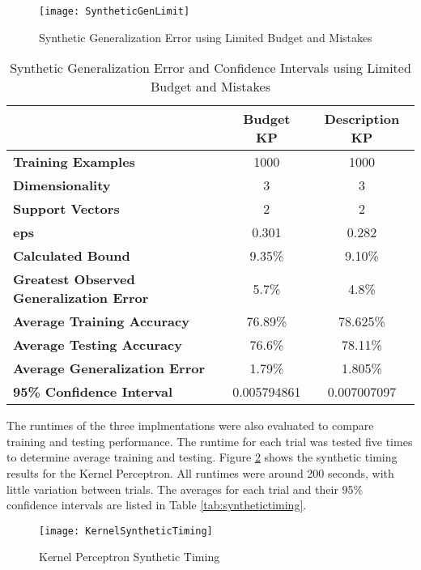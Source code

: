 \begin{figure}[p]
 \caption{Synthetic Generalization Error using Limited Budget and Mistakes}
 \label{SyntheticGenErr2Fig}
 \begin{center}
  \texttt{[image: SyntheticGenLimit]} 
 \end{center}
\end{figure}

\begin{table}[p]
 \begin{center}
  \caption{Synthetic Generalization Error and Confidence Intervals using Limited Budget and Mistakes}
  \label{tab:syntheticlimitedgen}
  \begin{tabular}{l|c|c}
  \textbf{ } & \textbf{Budget KP} & \textbf{Description KP}\\
  \hline
  \textbf{Training Examples} & 1000 & 1000\\
  \textbf{Dimensionality} & 3 & 3\\
  \textbf{Support Vectors} & 2 & 2\\
  \textbf{eps} & 0.301 & 0.282\\
  \hline
  \textbf{Calculated Bound} & 9.35\% & 9.10\%\\
  \textbf{Greatest Observed Generalization Error} & 5.7\% & 4.8\%\\
  \hline
  \textbf{Average Training Accuracy} & 76.89\% & 78.625\%\\
  \textbf{Average Testing Accuracy} & 76.6\% & 78.11\%\\
  \textbf{Average Generalization Error} & 1.79\% & 1.805\%\\
  \textbf{95\% Confidence Interval} & 0.005794861 & 0.007007097\\
  \end{tabular}
 \end{center}
\end{table}

The runtimes of the three implmentations were also evaluated to compare training and testing performance. The runtime for each trial was tested five times to determine average training and testing. Figure \ref{SyntheticKernelTiming} shows the synthetic timing results for the Kernel Perceptron. All runtimes were around 200 seconds, with little variation between trials. The averages for each trial and their 95\% confidence intervals are listed in Table \ref{tab:synthetictiming}.

\begin{figure}[p]
 \caption{Kernel Perceptron Synthetic Timing}
 \label{SyntheticKernelTiming}
 \texttt{[image: KernelSyntheticTiming]}
\end{figure}

